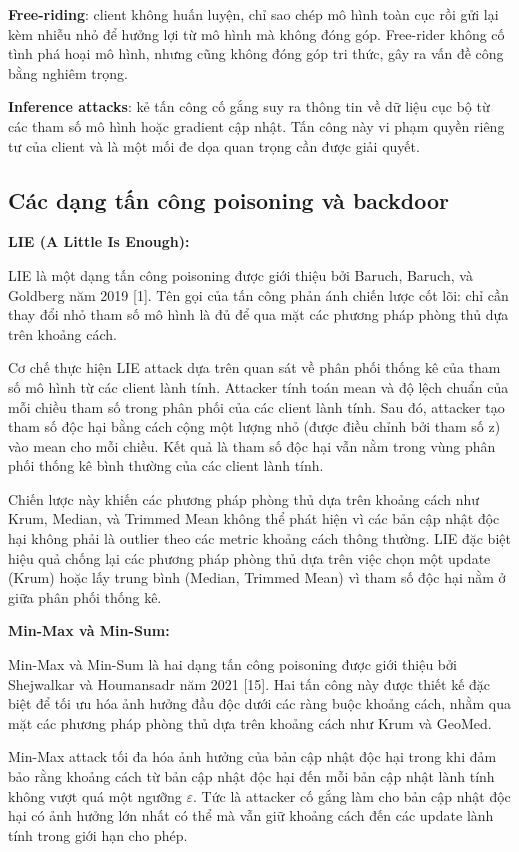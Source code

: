 \textbf{Free-riding}: client không huấn luyện, chỉ sao chép mô hình toàn cục rồi gửi lại kèm nhiễu nhỏ để hưởng lợi từ mô hình mà không đóng góp. Free-rider không cố tình phá hoại mô hình, nhưng cũng không đóng góp tri thức, gây ra vấn đề công bằng nghiêm trọng.

\textbf{Inference attacks}: kẻ tấn công cố gắng suy ra thông tin về dữ liệu cục bộ từ các tham số mô hình hoặc gradient cập nhật. Tấn công này vi phạm quyền riêng tư của client và là một mối đe dọa quan trọng cần được giải quyết.

\subsection{Các dạng tấn công poisoning và backdoor}
\textbf{LIE (A Little Is Enough):}

LIE là một dạng tấn công poisoning được giới thiệu bởi Baruch, Baruch, và Goldberg năm 2019 {[}1{]}. Tên gọi của tấn công phản ánh chiến lược cốt lõi: chỉ cần thay đổi nhỏ tham số mô hình là đủ để qua mặt các phương pháp phòng thủ dựa trên khoảng cách.

Cơ chế thực hiện LIE attack dựa trên quan sát về phân phối thống kê của tham số mô hình từ các client lành tính. Attacker tính toán mean và độ lệch chuẩn của mỗi chiều tham số trong phân phối của các client lành tính. Sau đó, attacker tạo tham số độc hại bằng cách cộng một lượng nhỏ (được điều chỉnh bởi tham số z) vào mean cho mỗi chiều. Kết quả là tham số độc hại vẫn nằm trong vùng phân phối thống kê bình thường của các client lành tính.

Chiến lược này khiến các phương pháp phòng thủ dựa trên khoảng cách như Krum, Median, và Trimmed Mean không thể phát hiện vì các bản cập nhật độc hại không phải là outlier theo các metric khoảng cách thông thường. LIE đặc biệt hiệu quả chống lại các phương pháp phòng thủ dựa trên việc chọn một update (Krum) hoặc lấy trung bình (Median, Trimmed Mean) vì tham số độc hại nằm ở giữa phân phối thống kê.

\textbf{Min-Max và Min-Sum:}

Min-Max và Min-Sum là hai dạng tấn công poisoning được giới thiệu bởi Shejwalkar và Houmansadr năm 2021 {[}15{]}. Hai tấn công này được thiết kế đặc biệt để tối ưu hóa ảnh hưởng đầu độc dưới các ràng buộc khoảng cách, nhằm qua mặt các phương pháp phòng thủ dựa trên khoảng cách như Krum và GeoMed.

Min-Max attack tối đa hóa ảnh hưởng của bản cập nhật độc hại trong khi đảm bảo rằng khoảng cách từ bản cập nhật độc hại đến mỗi bản cập nhật lành tính không vượt quá một ngưỡng $\varepsilon$. Tức là attacker cố gắng làm cho bản cập nhật độc hại có ảnh hưởng lớn nhất có thể mà vẫn giữ khoảng cách đến các update lành tính trong giới hạn cho phép.

